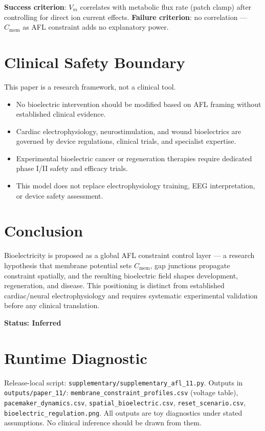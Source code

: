 \documentclass[12pt,a4paper]{article}
\begin{document}
\textbf{Success criterion}: $V_m$ correlates with metabolic flux rate (patch clamp) after controlling for direct ion current effects. \textbf{Failure criterion}: no correlation — $C_{\mathrm{mem}}$ as AFL constraint adds no explanatory power.

\section{Clinical Safety Boundary}

This paper is a research framework, not a clinical tool.
\begin{itemize}
    \item No bioelectric intervention should be modified based on AFL framing without established clinical evidence.
    \item Cardiac electrophysiology, neurostimulation, and wound bioelectrics are governed by device regulations, clinical trials, and specialist expertise.
    \item Experimental bioelectric cancer or regeneration therapies require dedicated phase I/II safety and efficacy trials.
    \item This model does not replace electrophysiology training, EEG interpretation, or device safety assessment.
\end{itemize}

\section{Conclusion}

Bioelectricity is proposed as a global AFL constraint control layer — a research hypothesis that membrane potential sets $C_{\mathrm{mem}}$, gap junctions propagate constraint spatially, and the resulting bioelectric field shapes development, regeneration, and disease. This positioning is distinct from established cardiac/neural electrophysiology and requires systematic experimental validation before any clinical translation.

\textbf{Status: Inferred}

\section{Runtime Diagnostic}

Release-local script: \texttt{supplementary/supplementary\_afl\_11.py}. Outputs in \texttt{outputs/paper\_11/}: \texttt{membrane\_constraint\_profiles.csv} (voltage table), \texttt{pacemaker\_dynamics.csv}, \texttt{spatial\_bioelectric.csv}, \texttt{reset\_scenario.csv}, \texttt{bioelectric\_regulation.png}. All outputs are toy diagnostics under stated assumptions. No clinical inference should be drawn from them.
\end{document}
